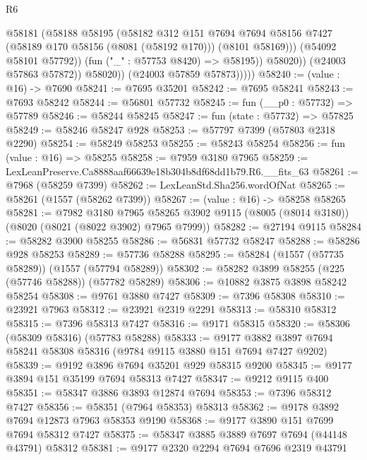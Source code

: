 \begin{lexlean}{R6}
\begin{coremodule}
                        @58181
                          (@58188
                            @58195
                            (@58182
                              @312
                              @151
                              @7694
                              @7694
                              @58156
                              @7427
                              (@58189 @170 @58156 (@8081 (@58192 @170)))
                              (@8101 @58169)))
                          (@54092 @58101 @57792))
                        (fun ("_" : @57753 @8420) => @58195))
                      @58020))
                  (@24003 @57863 @57872))
                @58020))
            (@24003 @57859 @57873)))))
@58240 := (value : @16) -> @7690
@58241 := @7695 @35201
@58242 := @7695 @58241
@58243 := @7693 @58242
@58244 := @56801 @57732
@58245 := fun (__p0 : @57732) => @57789
@58246 := @58244 @58245
@58247 := fun (state : @57732) => @57825
@58249 := @58246 @58247 @928
@58253 := @57797 @7399 (@57803 @2318 @2290)
@58254 := @58249 @58253
@58255 := @58243 @58254
@58256 := fun (value : @16) => @58255
@58258 := @7959 @3180 @7965
@58259 := LexLeanPreserve.Ca8888aaf66639e18b304b8df68dd1b79.R6.__fits_63
@58261 := @7968 (@58259 @7399)
@58262 := LexLeanStd.Sha256.wordOfNat
@58265 := @58261 (@1557 (@58262 @7399))
@58267 := (value : @16) -> @58258 @58265
@58281 := @7982
    @3180
    @7965
    @58265
    @3902
    @9115
    (@8005 (@8014 @3180))
    (@8020 (@8021 (@8022 @3902) @7965 @7999))
@58282 := @27194 @9115
@58284 := @58282 @3900 @58255
@58286 := @56831 @57732 @58247
@58288 := @58286 @928 @58253
@58289 := @57736 @58288
@58295 := @58284 (@1557 (@57735 @58289)) (@1557 (@57794 @58289))
@58302 := @58282 @3899 @58255 (@225 (@57746 @58288)) (@57782 @58289)
@58306 := @10882 @3875 @3898 @58242 @58254
@58308 := @9761 @3880 @7427
@58309 := @7396 @58308
@58310 := @23921 @7963
@58312 := @23921 @2319 @2291
@58313 := @58310 @58312
@58315 := @7396 @58313 @7427
@58316 := @9171 @58315
@58320 := @58306 (@58309 @58316) (@57783 @58288)
@58333 := @9177 @3882 @3897 @7694 @58241 @58308 @58316 (@9784 @9115 @3880 @151 @7694 @7427 @9202)
@58339 := @9192 @3896 @7694 @35201 @929 @58315 @9200
@58345 := @9177 @3894 @151 @35199 @7694 @58313 @7427
@58347 := @9212 @9115 @400
@58351 := @58347 @3886 @3893 @12874 @7694
@58353 := @7396 @58312 @7427
@58356 := @58351 (@7964 @58353) @58313
@58362 := @9178 @3892 @7694 @12873 @7963 @58353 @9190
@58368 := @9177 @3890 @151 @7699 @7694 @58312 @7427
@58375 := @58347 @3885 @3889 @7697 @7694 (@44148 @43791) @58312
@58381 := @9177 @2320 @2294 @7694 @7696 @2319 @43791

\end{coremodule}
\end{lexlean}

